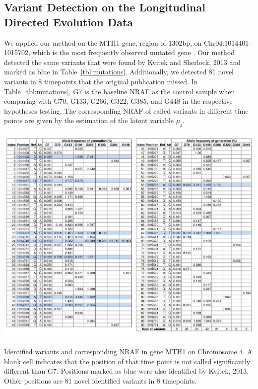 \documentclass[11pt,reqno]{amsart}
\begin{document}
\subsection{Variant Detection on the Longitudinal Directed Evolution Data}
We applied our method on the MTH1 gene, region of 1302bp, on Chr04:1014401-1015702, which is the most frequently observed mutated gene \citep{kvitek2013whole}.
Our method detected the same variants that were found by Kvitek and Sherlock, 2013 and marked as blue in Table~\ref{tbl:mutations}.
Additionally, we detected 81 novel variants in 8 timepoints that the original publication missed.
In Table~\ref{tbl:mutations}, G7 is the baseline NRAF as the control sample when comparing with G70, G133, G266, G322, G385, and G448 in the respective hypotheses testing.
The corresponding NRAF of called variants in different time points are given by the estimation of the latent variable $\mu_j$.
\begin{table}[htbp]
\centering
\includegraphics[width=1.0\textwidth]{tables/mutations_MTH1.png}
\caption{Identified variants and corresponding NRAF in gene MTH1 on Chromosome 4.
A blank cell indicates that the position of that time point is not called significantly different than G7.
Positions marked as blue were also identified by Kvitek, 2013.
Other positions are 81 novel identified variants in 8 timepoints.}
\label{tbl:mutations}
\end{table}
\end{document}
